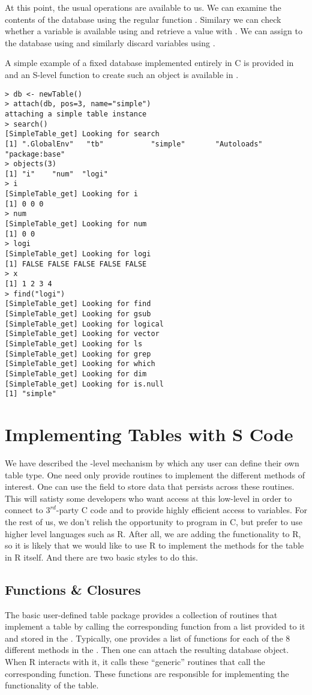 \documentclass{article}
\begin{document}
At this point, the usual operations are available to us.  We can
examine the contents of the database using the regular function
.  Similary we can check whether a variable is
available using  and retrieve a value with
. We can assign to the database using
 and similarly discard variables using
.

A simple example of a fixed database implemented entirely in C is
provided in  and an S-level function to create
such an object is available in .

\begin{verbatim}
> db <- newTable()
> attach(db, pos=3, name="simple")
attaching a simple table instance
> search()
[SimpleTable_get] Looking for search
[1] ".GlobalEnv"   "tb"           "simple"       "Autoloads"    "package:base"
> objects(3)
[1] "i"    "num"  "logi"
> i
[SimpleTable_get] Looking for i
[1] 0 0 0
> num
[SimpleTable_get] Looking for num
[1] 0 0
> logi
[SimpleTable_get] Looking for logi
[1] FALSE FALSE FALSE FALSE FALSE
> x
[1] 1 2 3 4
> find("logi")
[SimpleTable_get] Looking for find
[SimpleTable_get] Looking for gsub
[SimpleTable_get] Looking for logical
[SimpleTable_get] Looking for vector
[SimpleTable_get] Looking for ls
[SimpleTable_get] Looking for grep
[SimpleTable_get] Looking for which
[SimpleTable_get] Looking for dim
[SimpleTable_get] Looking for is.null
[1] "simple"
\end{verbatim}


\section{Implementing Tables with S Code}
We have described the \C-level mechanism by which any user can define
their own table type. One need only provide routines to implement the
different methods of interest. One can use the 
field to store data that persists across these routines.  This will
satisty some developers who want access at this low-level in order to
connect to $3^{rd}$-party C code and to provide highly efficient
access to variables. For the rest of us, we don't relish the
opportunity to program in C, but prefer to use higher level languages
such as R. After all, we are adding the functionality to R, so it is
likely that we would like to use R to implement the methods for the
table in R itself. And there are two basic styles to do this.


\subsection{Functions \& Closures} 
The basic user-defined table package provides a collection of \C{}
routines that implement a table by calling the corresponding function
from a list provided to it and stored in the .
Typically, one provides a list of functions for each of the $8$
different methods in the .  Then one can attach
the resulting database object.  When R interacts with it, it calls these
``generic'' \C{} routines that call the corresponding function.
These functions are responsible for implementing the functionality
of the table.
\end{document}
